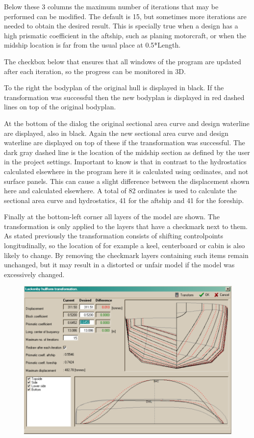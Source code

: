 \documentclass[12pt]{article}
\begin{document}
Below these 3 columns the maximum number of iterations that may be
performed can be modified.  The default is 15, but sometimes more
iterations are needed to obtain the desired result. This is specially
true when a design has a high prismatic coefficient in the aftship,
such as planing motorcraft, or when the midship location is far from
the usual place at 0.5*Length.

The checkbox below that ensures that all windows of the program are
updated after each iteration, so the progress can be monitored in 3D.

To the right the bodyplan of the original hull is displayed in
black. If the transformation was successful then the new bodyplan is
displayed in red dashed lines on top of the original bodyplan.

At the bottom of the dialog the original sectional area curve and
design waterline are displayed, also in black. Again the new sectional
area curve and design waterline are displayed on top of these if the
transformation was successful. The dark gray dashed line is the
location of the midship section as defined by the user in the project
settings. Important to know is that in contrast to the hydrostatics
calculated elsewhere in the program here it is calculated using
ordinates, and not surface panels. This can cause a slight difference
between the displacement shown here and calculated elsewhere. A total
of 82 ordinates is used to calculate the sectional area curve and
hydrostatics, 41 for the aftship and 41 for the foreship.

Finally at the bottom-left corner all layers of the model are
shown. The transformation is only applied to the layers that have a
checkmark next to them. As stated previously the transformation
consists of shifting controlpoints longitudinally, so the location of
for example a keel, centerboard or cabin is also likely to change. By
removing the checkmark layers containing such items remain unchanged,
but it may result in a distorted or unfair model if the model was
excessively changed.

\begin{figure}[h]
        \centering
        \includegraphics[width=15cm,natwidth=880,natheight=626]{lackenbydialog-2.png}
        \caption{}
        \label{fig:lackenby-2}
\end{figure}
\end{document}
